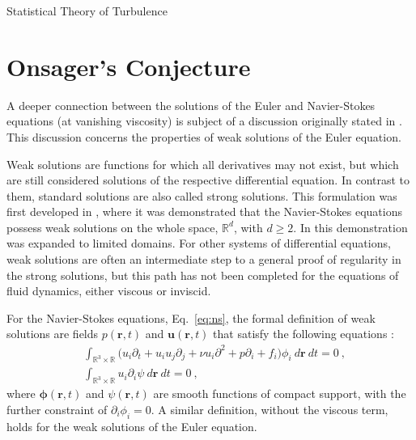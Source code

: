 \begin{chapter}{Statistical Theory of Turbulence}
\section{Onsager's Conjecture} \label{sec:onsager}

A deeper connection between the solutions of the Euler
and Navier-Stokes equations (at vanishing viscosity)
is subject of a discussion originally stated in \textcite{onsager1949statistical}.
This discussion concerns the properties of weak solutions of the Euler equation.

Weak solutions are functions for which all derivatives may not exist, but which
are still considered solutions of the respective differential equation.
In contrast to them, standard solutions are also called strong solutions.
This formulation was first developed in \textcite{leray1934}, where it
was demonstrated that the Navier-Stokes equations
possess weak solutions on the whole space, $\mathbb{R}^d$, with $d \geq 2$.
In \textcite{hopf1950uber} this demonstration was expanded to limited domains.
For other systems of differential equations, weak solutions are often an intermediate step to a general proof of regularity in the strong solutions, but this path has not been completed for the equations of fluid dynamics, either viscous
or inviscid.

For the Navier-Stokes equations, Eq.~\eqref{eq:ns}, the formal definition
of weak solutions are fields $p(\mathbf{r},t)$ and $\mathbf{u}(\mathbf{r},t)$
that satisfy the following equations \parencite{bernard2000}:
\begin{equation}
\begin{split}
&\int_{\mathbb{R}^3 \times \mathbb{R}} \Big( u_i \partial_t + u_i u_j \partial_j + \nu u_i \partial^2 + p \partial_i + f_i \Big) \phi_i \ d\mathbf{r} \ dt = 0 \ , \\
&\int_{\mathbb{R}^3 \times \mathbb{R}} u_i \partial_i \psi \ d\mathbf{r} \ dt = 0 \ ,
\end{split}
\end{equation}
where $\bm{\phi}(\mathbf{r},t)$ and $\psi(\mathbf{r},t)$ are smooth functions of compact support, with the further constraint of $\partial_i \phi_i = 0$.
A similar definition, without the viscous term, holds for the weak solutions of the
Euler equation.


\end{chapter}

